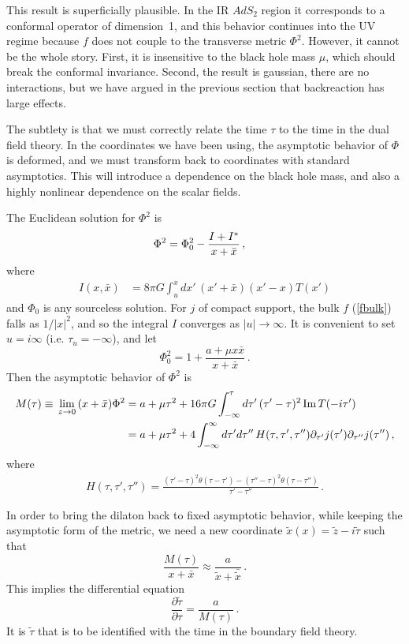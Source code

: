 \documentclass[12pt]{article}
\newcommand{\be}{\begin{equation}}
\newcommand{\ee}{\end{equation}}
\begin{document}
This result is superficially plausible.  In the IR $AdS_2$ region it corresponds to a conformal operator of dimension~1, and this behavior continues into the UV regime because $f$ does not couple to the transverse metric $\Phi^2$.  However, it cannot be the whole story.  First, it is insensitive to the black hole mass $\mu$, which should break the conformal invariance.  Second, the result is gaussian, there are no interactions, but we have argued in the previous section that backreaction has large effects.

The subtlety is that we must correctly relate the time $\tau$ to the time in the dual field theory.  In the coordinates we have been using, the asymptotic behavior of  $\Phi$ is deformed, and we must transform back to coordinates with standard asymptotics.  This will introduce a dependence on the black hole mass, and also a highly nonlinear dependence on the scalar fields. 

The Euclidean solution for $\Phi^2$ is
\begin{align}
\Phi^2 &= \Phi^2_0 - {I + I^* \over x + \bar{x}} \,,
\end{align}
where
\begin{align}
I(x, \bar x) &= 8\pi G \int_u^x dx'\,
(x' + \bar x)(x' - x) T(x') 
\end{align} 
and $\Phi_0$ is any sourceless solution.  For $j$ of compact support, the bulk $f$ (\ref{fbulk}) falls as $1/|x|^2$, and so the integral $I$ converges as $|u| \to \infty$.  It is convenient to set $u = i \infty$ (i.e. $\tau_u = -\infty$), and let 
\be
\Phi_0^2 = 1 + \frac{a + \mu x\bar x}{x+\bar x} \,.
\ee
Then the asymptotic behavior of $\Phi^2$ is
\begin{align}
M(\tau) \equiv \,\lim_{z \to 0}\, (x + \bar x) \Phi^2 &= a + \mu \tau^2 + 16 \pi G \int_{-\infty}^\tau d\tau'\, (\tau' - \tau)^2 \, {\rm Im}\, T(-i\tau') 
\nonumber\\
&= a + \mu \tau^2 + 4  \int_{-\infty}^\infty d\tau' d\tau''\, H(\tau, \tau',\tau'')
\partial_{\tau'}j(\tau') \partial_{\tau''}j(\tau'')  \,,
\end{align}
where
\begin{align}
H(\tau, \tau',\tau'') = \frac{(\tau'-\tau)^2  \theta( \tau-\tau') - (\tau''-\tau)^2  \theta(\tau-\tau'')   }{ \tau' - \tau''} \,.
\end{align}

In order to bring the dilaton back to fixed asymptotic behavior, while keeping the asymptotic form of the metric, we need a new coordinate $\tilde x(x) = \tilde z - i\tilde \tau$ such that 
\be
\frac{M(\tau)}{x + \bar x} \approx \frac{a}{\tilde x + \bar{\tilde x}} \,.
\ee
This implies the differential equation
\be
\frac{\partial \tilde \tau}{\partial \tau} = \frac{a}{M(\tau)}\,. \label{timediff}
\ee
It is $\tilde\tau$ that is to be identified with the time in the boundary field theory.
\end{document}
